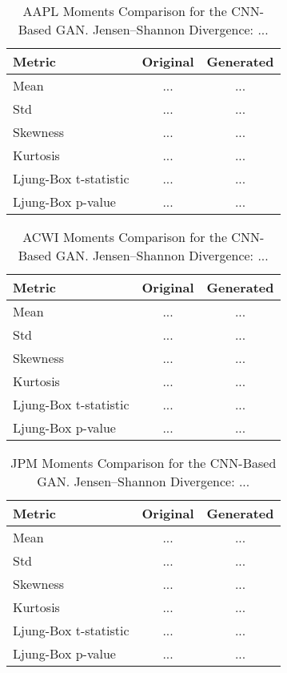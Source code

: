 \documentclass{article}
\begin{document}
\begin{table}[h!]
\centering
\begin{tabular}{lcc}
\hline
\textbf{Metric} & \textbf{Original} & \textbf{Generated} \\
\hline
Mean     & ... & ... \\
Std      & ... & ... \\
Skewness & ... & ... \\
Kurtosis & ... & ... \\
Ljung-Box t-statistic & ... & ... \\
Ljung-Box p-value & ... & ... \\
\hline
\end{tabular}
\caption{AAPL Moments Comparison for the CNN-Based GAN.
Jensen--Shannon Divergence: ...}
\label{tab:aapl_cnn}
\end{table}

\begin{table}[h!]
\centering
\begin{tabular}{lcc}
\hline
\textbf{Metric} & \textbf{Original} & \textbf{Generated} \\
\hline
Mean     & ... & ... \\
Std      & ... & ... \\
Skewness & ... & ... \\
Kurtosis & ... & ... \\
Ljung-Box t-statistic & ... & ... \\
Ljung-Box p-value & ... & ... \\
\hline
\end{tabular}
\caption{ACWI Moments Comparison for the CNN-Based GAN.
Jensen--Shannon Divergence: ...}
\label{tab:acwi_cnn}
\end{table}

\begin{table}[h!]
\centering
\begin{tabular}{lcc}
\hline
\textbf{Metric} & \textbf{Original} & \textbf{Generated} \\
\hline
Mean     & ... & ... \\
Std      & ... & ... \\
Skewness & ... & ... \\
Kurtosis & ... & ... \\
Ljung-Box t-statistic & ... & ... \\
Ljung-Box p-value & ... & ... \\
\hline
\end{tabular}
\caption{JPM Moments Comparison for the CNN-Based GAN.
Jensen--Shannon Divergence: ...}
\label{tab:jpm_cnn}
\end{table}
\end{document}
